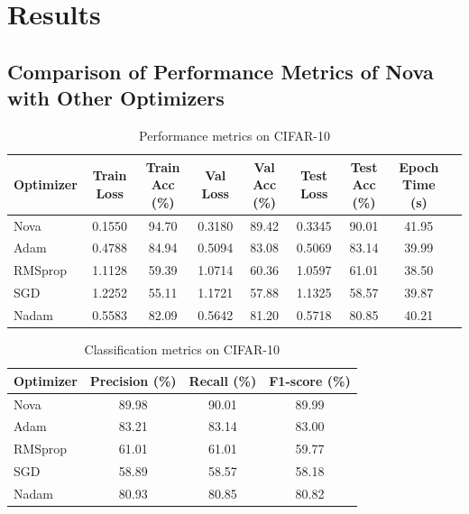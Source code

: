 \documentclass{article}
\begin{document}
\section{Results} \label{Sec 5}

\subsection{Comparison of Performance Metrics of Nova with Other Optimizers} 

%






\begin{table}[H]
\centering
\caption{Performance metrics on CIFAR-10}
\begin{tabular}{lcccccccc}
\toprule
Optimizer & Train Loss & Train Acc (\%) & Val Loss & Val Acc (\%) & Test Loss & Test Acc (\%) & Epoch Time (s) \\
\midrule
Nova & 0.1550 & 94.70 & 0.3180 & 89.42 & 0.3345 & 90.01 & 41.95 \\
Adam & 0.4788 & 84.94 & 0.5094 & 83.08 & 0.5069 & 83.14& 39.99\\
RMSprop & 1.1128 & 59.39 & 1.0714 & 60.36 & 1.0597 & 61.01& 38.50 \\
SGD & 1.2252 & 55.11 & 1.1721 & 57.88 & 1.1325 & 58.57&39.87  \\
Nadam & 0.5583 & 82.09 & 0.5642 & 81.20 & 0.5718 & 80.85&40.21  \\
\bottomrule
\end{tabular}
\label{tab:cifar-10_main}
\end{table}


\begin{table}[H]
\centering
\caption{Classification metrics on CIFAR-10}
\begin{tabular}{lccc}
\toprule
Optimizer & Precision (\%) & Recall (\%) & F1-score (\%) \\
\midrule
Nova & 89.98 & 90.01 & 89.99 \\
Adam & 83.21 & 83.14 & 83.00 \\
RMSprop & 61.01 & 61.01 & 59.77 \\
SGD & 58.89 & 58.57 & 58.18 \\
Nadam & 80.93 & 80.85 & 80.82 \\
\bottomrule
\end{tabular}
\label{tab:cifar-10_prf}
\end{table}
\end{document}
